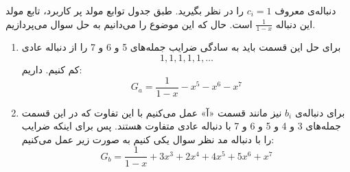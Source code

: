     \p
    دنباله‌ی معروف 
    $c_i = 1$
    را در نظر بگیرید. طبق جدول توابع مولد پر کاربرد، تابع مولد این دنباله
    $\frac{1}{1-x}$
    است.
حال که این موضوع را می‌دانیم به حل سوال می‌پردازیم.
\begin{enumerate}
    \item 
            برای حل این قسمت باید به سادگی ضرایب جمله‌های 5 و 6 و 7 را از دنباله عادی
            $${1,1,1,1,1,\ldots}$$
            کم کنیم. داریم:
            $$G_{a} = \frac{1}{1-x} - x^5 - x^6 - x^7$$
    \item
            برای دنباله‌ی 
            $b_i$
              نیز مانند قسمت «آ» عمل می‌کنیم با این تفاوت که در این قسمت جمله‌های 3 و 4 و 5 و 6 و 7 با دنباله عادی متفاوت هستند. پس برای اینکه ضرایب را با دنباله مد نظر سوال یکی کنیم به صورت زیر عمل می‌کنیم:
            $$G_{b} = \frac{1}{1-x} + 3x^3 + 2x^4 + 4x^5 + 5x^6 + x^7$$
      
\end{enumerate}
